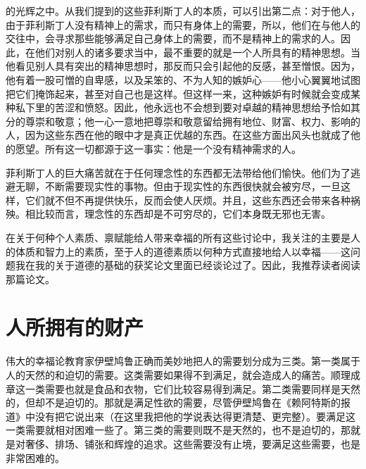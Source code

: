 \documentclass[12pt,oneside]{book}
\begin{document}
的光辉之中。从我们提到的这些菲利斯丁人的本质，可以引出第二点：对于他人，由于菲利斯丁人没有精神上的需求，而只有身体上的需要，所以，他们在与他人的交往中，会寻求那些能够满足自己身体上的需要，而不是精神上的需求的人。因此，在他们对别人的诸多要求当中，最不重要的就是一个人所具有的精神思想。当他看见别人具有突出的精神思想时，那反而只会引起他的反感，甚至憎恨。因为，他有着一股可憎的自卑感，以及呆笨的、不为人知的嫉妒心——他小心翼翼地试图把它们掩饰起来，甚至对自己也是这样。但这样一来，这种嫉妒有时候就会变成某种私下里的苦涩和愤怒。因此，他永远也不会想到要对卓越的精神思想给予恰如其分的尊崇和敬意；他一心一意地把尊崇和敬意留给拥有地位、财富、权力、影响的人，因为这些东西在他的眼中才是真正优越的东西。在这些方面出风头也就成了他的愿望。所有这一切都源于这一事实：他是一个没有精神需求的人。 

菲利斯丁人的巨大痛苦就在于任何理念性的东西都无法带给他们愉快。他们为了逃避无聊，不断需要现实性的事物。但由于现实性的东西很快就会被穷尽，一旦这样，它们就不但不再提供快乐，反而会使人厌烦。并且，这些东西还会带来各种祸殃。相比较而言，理念性的东西却是不可穷尽的，它们本身既无邪也无害。 


在关于何种个人素质、禀赋能给人带来幸福的所有这些讨论中，我关注的主要是人的体质和智力上的素质，至于人的道德素质以何种方式直接地给人以幸福——这问题我在我的关于道德的基础的获奖论文里面已经谈论过了。因此，我推荐读者阅读那篇论文。 


\chapter{人所拥有的财产} 
伟大的幸福论教育家伊壁鸠鲁正确而美妙地把人的需要划分成为三类。第一类属于人的天然的和迫切的需要。这类需要如果得不到满足，就会造成人的痛苦。顺理成章这一类需要也就是食品和衣物，它们比较容易得到满足。第二类需要同样是天然的，但却不是迫切的。那就是满足性欲的需要，尽管伊壁鸠鲁在《赖阿特斯的报道》中没有把它说出来（在这里我把他的学说表达得更清楚、更完整）。要满足这一类需要就相对困难一些了。第三类的需要则既不是天然的，也不是迫切的，那就是对奢侈、排场、铺张和辉煌的追求。这些需要没有止境，要满足这些需要，也是非常困难的。 
\end{document}
